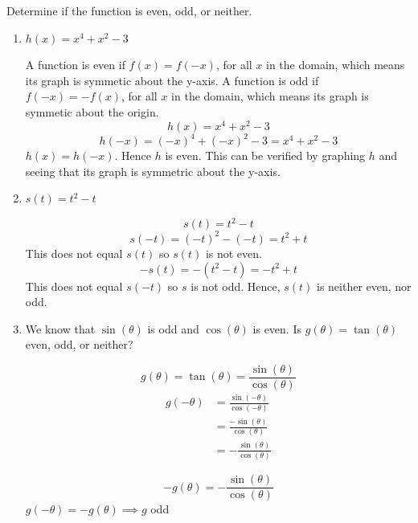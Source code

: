 \documentclass[nooutcomes]{ximera}
\begin{document}
\begin{problem}
Determine if the function is even, odd, or neither.


\begin{enumerate}	
	\item  $h(x)=x^4+x^2-3$
		\begin{freeResponse}

		A function is even if $f(x)=f(-x)$, for all $x$ in the domain, which means its graph is symmetic about the y-axis.  A function is odd if $f(-x)=-f(x)$, for all $x$ in the domain, which means its graph is symmetic about the origin. 
		 $$h(x)=x^4+x^2-3$$
			$$h(-x)=(-x)^4+(-x)^2-3=x^4+x^2-3$$
			$h(x)=h(-x)$.  Hence $h$ is even.  This can be verified by graphing $h$ and seeing that its graph is symmetric about the y-axis.
		\end{freeResponse}

	\item  $s(t)=t^2-t$
		\begin{freeResponse}
			$$s(t)=t^2-t$$
			$$s(-t)=(-t)^2-(-t)=t^2+t$$ This does not equal $s(t)$ so $s(t)$ is not even.
			$$-s(t)=-(t^2-t)=-t^2+t$$  This does not equal $s(-t)$ so $s$ is not odd.  Hence, $s(t)$ is neither even, nor odd.
		\end{freeResponse}

	\item  We know that $\sin(\theta)$ is odd and $\cos(\theta)$ is even.  Is $g(\theta)=\tan(\theta)$ even, odd, or neither?
		\begin{freeResponse}
		 $$g(\theta)=\tan(\theta)=\frac{\sin(\theta)}{\cos(\theta)}$$
			\begin{align*}
			g(-\theta)&=\frac{\sin(-\theta)}{\cos(-\theta)}\\
			&=\frac{-\sin(\theta)}{\cos(\theta)}\\
			&=-\frac{\sin(\theta)}{\cos(\theta)}
			\end{align*}
			\begin{center}
			$$-g(\theta)=-\frac{\sin(\theta)}{\cos(\theta)}$$
			$g(-\theta)=-g(\theta) \implies g$ odd
			\end{center}
		\end{freeResponse}
	\end{enumerate}
	

	
\end{problem}
\end{document}
